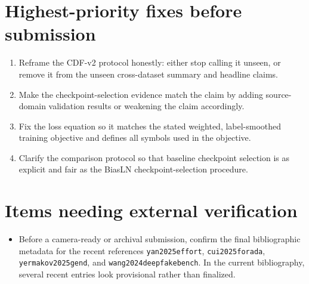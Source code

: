 \documentclass[11pt]{article}
\begin{document}
\section*{Highest-priority fixes before submission}
\begin{enumerate}[leftmargin=*]
    \item Reframe the CDF-v2 protocol honestly: either stop calling it unseen, or remove it from the unseen cross-dataset summary and headline claims.
    \item Make the checkpoint-selection evidence match the claim by adding source-domain validation results or weakening the claim accordingly.
    \item Fix the loss equation so it matches the stated weighted, label-smoothed training objective and defines all symbols used in the objective.
    \item Clarify the comparison protocol so that baseline checkpoint selection is as explicit and fair as the BiasLN checkpoint-selection procedure.
\end{enumerate}

\section*{Items needing external verification}
\begin{itemize}
    \item Before a camera-ready or archival submission, confirm the final bibliographic metadata for the recent references \texttt{yan2025effort}, \texttt{cui2025forada},\\
    \texttt{yermakov2025gend}, and \texttt{wang2024deepfakebench}. In the current bibliography, several recent entries look provisional rather than finalized.
\end{itemize}
\end{document}
